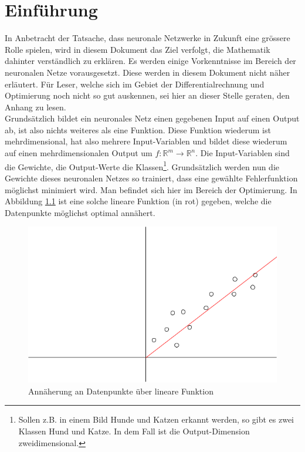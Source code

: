 \chapter{Einführung}
In Anbetracht der Tatsache, dass neuronale Netzwerke in Zukunft eine grössere Rolle spielen, wird in diesem Dokument
das Ziel verfolgt, die Mathematik dahinter verständlich zu erklären. Es werden einige Vorkenntnisse im Bereich der neuronalen Netze
vorausgesetzt. Diese werden in diesem Dokument nicht näher erläutert. Für Leser, welche sich im Gebiet der
Differentialrechnung und Optimierung noch nicht so gut auskennen, sei hier an dieser Stelle geraten, den Anhang zu lesen.
\\

Grundsätzlich bildet ein neuronales Netz einen gegebenen Input auf einen Output ab, ist also nichts weiteres als
eine Funktion. Diese Funktion wiederum ist mehrdimensional, hat also mehrere Input-Variablen und bildet diese wiederum
auf einen mehrdimensionalen Output um $f: \mathbb{R}^m \rightarrow \mathbb{R}^n$. Die Input-Variablen sind die Gewichte, die Output-Werte
die Klassen\footnote{Sollen z.B. in einem Bild Hunde und Katzen erkannt werden, so gibt es zwei Klassen \glqq Hund\grqq{} und \glqq Katze\grqq.
In dem Fall ist die Output-Dimension zweidimensional.}. Grundsätzlich werden nun die Gewichte dieses neuronalen Netzes so trainiert, dass eine gewählte Fehlerfunktion
möglichst minimiert wird. Man befindet sich hier im Bereich der Optimierung. In Abbildung \ref{fig:05_approximation}
ist eine solche lineare Funktion (in rot) gegeben, welche die Datenpunkte möglichst optimal annähert.
\begin{figure}[h!]
    \begin{center}
        \includegraphics[width=0.3\linewidth]{../common/00_introduction/00_resources/00_approximation.png}
    \end{center}
    \caption{Annäherung an Datenpunkte über lineare Funktion}
    \label{fig:05_approximation}
\end{figure}